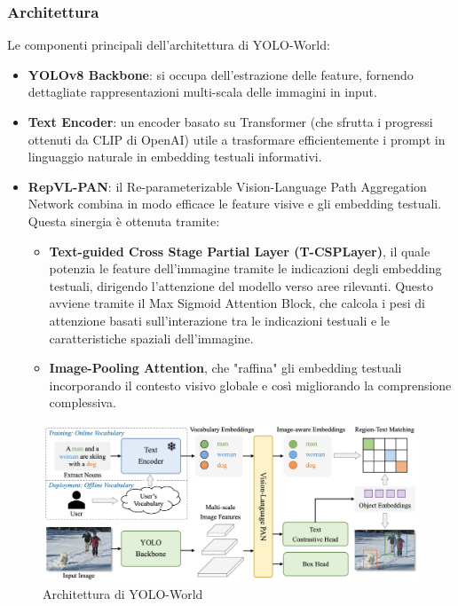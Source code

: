 \subsubsection{Architettura}
Le componenti principali dell'architettura di YOLO-World:
\begin{itemize}
  \item \textbf{YOLOv8 Backbone}: si occupa dell'estrazione delle feature, fornendo dettagliate rappresentazioni multi-scala delle immagini in input.
  \item \textbf{Text Encoder}: un encoder basato su Transformer (che sfrutta i progressi ottenuti da CLIP di OpenAI) utile a trasformare efficientemente i prompt in linguaggio naturale in embedding testuali informativi.
  \item \textbf{RepVL-PAN}: il Re-parameterizable Vision-Language Path Aggregation Network combina in modo efficace le feature visive e gli embedding testuali. Questa sinergia è ottenuta tramite:
  \begin{itemize}
    \item \textbf{Text-guided Cross Stage Partial Layer (T-CSPLayer)}, il quale potenzia le feature dell'immagine tramite le indicazioni degli embedding testuali, dirigendo l'attenzione del modello verso aree rilevanti. Questo avviene tramite il Max Sigmoid Attention Block, che calcola i pesi di attenzione basati sull'interazione tra le indicazioni testuali e le caratteristiche spaziali dell'immagine.
    \item \textbf{Image-Pooling Attention}, che "raffina" gli embedding testuali incorporando il contesto visivo globale e così migliorando la comprensione complessiva.
  \end{itemize}
\end{itemize}

\vspace{1cm}

\begin{figure}[ht]
    \centering
    \includegraphics[width=1\textwidth]{files/capitoli/2-yolo/assets/yoloworld-architecture.jpeg}
    \caption{\label{fig:yoloworld-architecture}Architettura di YOLO-World\cite{30}}
\end{figure}

